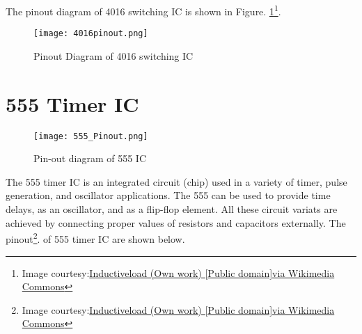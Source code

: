 The pinout diagram of 4016 switching IC is shown in Figure. \ref{4016pin}\footnote{Image courtesy:\href{http://commons.wikimedia.org/wiki/File\%3A4016\_Pinout.svg}{Inductiveload (Own work) [Public domain]via Wikimedia Commons}}.
\begin{figure}
\texttt{[image: 4016pinout.png]}
\caption{Pinout Diagram of 4016 switching IC}
\label{4016pin}
\end{figure}



\section{555 Timer IC}
\label{555}
\begin{figure}[h]
\texttt{[image: 555\_Pinout.png]}
\caption{Pin-out diagram of 555 IC}
\end{figure}
The 555 timer IC is an integrated circuit (chip) used in a variety of timer, pulse generation, and oscillator applications. The 555 can be used to provide time delays, as an oscillator, and as a flip-flop element. All these circuit variats are achieved by connecting proper values of resistors and capacitors externally.
The pinout\footnote{Image courtesy:\href{https://commons.wikimedia.org/wiki/\%3A555\_Pinout.svg}{Inductiveload (Own work) [Public domain]via Wikimedia Commons}}. %
of 555 timer IC are shown below.


